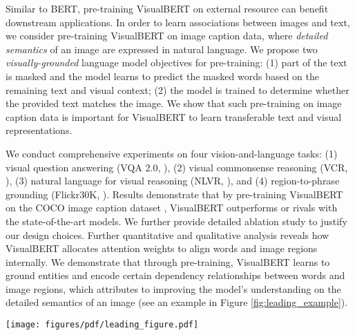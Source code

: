 \documentclass{article} \usepackage{iclr2019_conference,times}
\newcommand{\model}{VisualBERT\xspace}
\begin{document}
Similar to BERT, pre-training \model on external resource can benefit downstream applications. In order to learn associations between images and text, we consider pre-training \model on image caption data, where \textit{detailed semantics} of an image are expressed in natural language. 
We propose two \textit{visually-grounded} language model objectives for pre-training: (1) part of the text is masked and the model learns to predict the masked words based on the remaining text and visual context; (2) the model is trained to determine whether the provided text matches the image. We show that such pre-training on image caption data is important for \model to learn transferable text and visual representations. 

We conduct comprehensive experiments on four vision-and-language tasks: (1) visual question answering (VQA 2.0, \citet{balanced_vqa_v2}), (2) visual commonsense reasoning (VCR, \citet{zellers2019recognition}), (3) natural language for visual reasoning (NLVR, \citet{suhr2018corpus}), and (4) region-to-phrase grounding (Flickr30K, \citet{plummer2015flickr30k}).
Results demonstrate that by pre-training \model on the COCO image caption dataset \citep{chen2015microsoft}, \model outperforms or rivals with the state-of-the-art models. We further provide detailed ablation study to justify our design choices. Further quantitative and qualitative analysis reveals how \model allocates attention weights to align words and image regions internally. We demonstrate that through pre-training, \model learns to ground entities and encode certain dependency relationships between words and image regions, which attributes to improving the model's understanding on the detailed semantics of an image (see an example in Figure \ref{fig:leading_example}).

\begin{figure*} [t]
\centering
\texttt{[image: figures/pdf/leading\_figure.pdf]}
\caption{Attention weights of some selected heads in \model. In high layers (e.g., the 10-th and 11-th layer), \model is capable of implicitly grounding visual concepts (e.g., ``other pedestrians'' and ``man wearing white shirt'').  The model also captures certain syntactic dependency relations (e.g., ``walking'' is aligned to the \textit{man} region in the 6-th layer). The model also refines its understanding over the layers, incorrectly aligning ``man'' and ``shirt'' in the 3-rd layer but correcting them in higher layers.  (See more details in \S \ref{sec:casestudy}.) }
\label{fig:leading_example}
\end{figure*}
 
\end{document}
